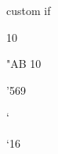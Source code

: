 \if@director
 custom if
\else
\fi

\relax




 10

\count"AB 10


\dimen'569

\dimen`\a  

\dimen`16 

\counting

\newdimen\mydimen

\newcount { \mycounter }

